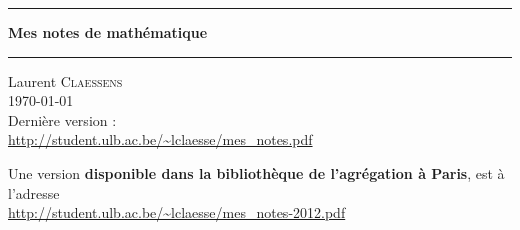 
\thispagestyle{empty}
\begin{center}
  \begin{minipage}{15cm}
    \hrule\par
    \vspace{2mm}
    \begin{center}
    \Huge \bfseries Mes notes de mathématique \par
    \end{center}
    \hrule\par
  \end{minipage}
\end{center}

\vspace{2cm}

\begin{center}
    Laurent \textsc{Claessens}\\
    \today\\

    Dernière version :\\
    \url{http://student.ulb.ac.be/~lclaesse/mes_notes.pdf}

    \vspace{1cm}

    Une version {\bf disponible dans la bibliothèque de l'agrégation à Paris}, est à l'adresse\\
    \url{http://student.ulb.ac.be/~lclaesse/mes_notes-2012.pdf}



\end{center}

\vfill

\LogoEtLicence


